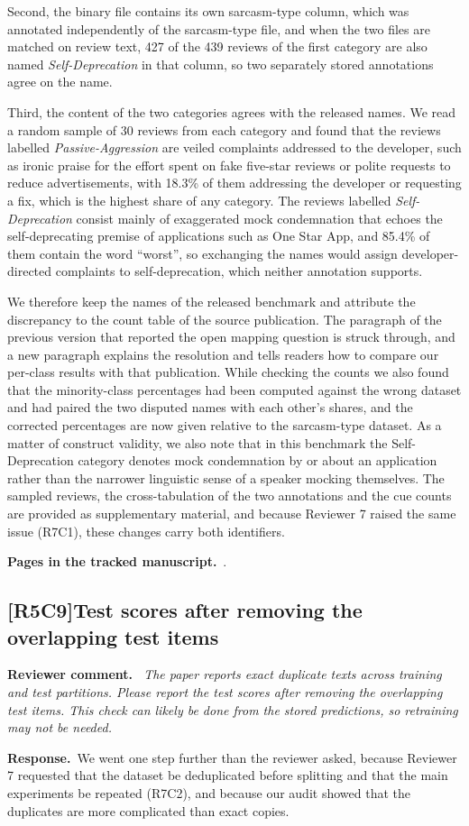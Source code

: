 \documentclass[11pt,a4paper]{article}
\newcommand{\comment}[3]{\subsection*{\textcolor{#1}{[#2]}\enspace #3}}
\newenvironment{reviewercomment}{\par\noindent\textbf{Reviewer comment.}\itshape\ }{\par}
\newcommand{\response}{\par\noindent\textbf{Response.}\ }
\newcommand{\where}[1]{\par\noindent\textbf{Pages in the tracked manuscript.}\ \rvpages[M-]{#1}.}
\begin{document}
Second, the binary file contains its own sarcasm-type column, which was annotated independently of the sarcasm-type file, and when the two files are matched on review text, 427 of the 439 reviews of the first category are also named \textit{Self-Deprecation} in that column, so two separately stored annotations agree on the name.

Third, the content of the two categories agrees with the released names. We read a random sample of 30 reviews from each category and found that the reviews labelled \textit{Passive-Aggression} are veiled complaints addressed to the developer, such as ironic praise for the effort spent on fake five-star reviews or polite requests to reduce advertisements, with 18.3\% of them addressing the developer or requesting a fix, which is the highest share of any category. The reviews labelled \textit{Self-Deprecation} consist mainly of exaggerated mock condemnation that echoes the self-deprecating premise of applications such as One Star App, and 85.4\% of them contain the word ``worst'', so exchanging the names would assign developer-directed complaints to self-deprecation, which neither annotation supports.

We therefore keep the names of the released benchmark and attribute the discrepancy to the count table of the source publication. The paragraph of the previous version that reported the open mapping question is struck through, and a new paragraph explains the resolution and tells readers how to compare our per-class results with that publication. While checking the counts we also found that the minority-class percentages had been computed against the wrong dataset and had paired the two disputed names with each other's shares, and the corrected percentages are now given relative to the sarcasm-type dataset. As a matter of construct validity, we also note that in this benchmark the Self-Deprecation category denotes mock condemnation by or about an application rather than the narrower linguistic sense of a speaker mocking themselves. The sampled reviews, the cross-tabulation of the two annotations and the cue counts are provided as supplementary material, and because Reviewer 7 raised the same issue (R7C1), these changes carry both identifiers.

\where{R5C8}

\comment{rvBoth}{R5C9}{Test scores after removing the overlapping test items}
\begin{reviewercomment}
The paper reports exact duplicate texts across training and test partitions. Please report the test scores after removing the overlapping test items. This check can likely be done from the stored predictions, so retraining may not be needed.
\end{reviewercomment}
\response We went one step further than the reviewer asked, because Reviewer 7 requested that the dataset be deduplicated before splitting and that the main experiments be repeated (R7C2), and because our audit showed that the duplicates are more complicated than exact copies.
\end{document}
